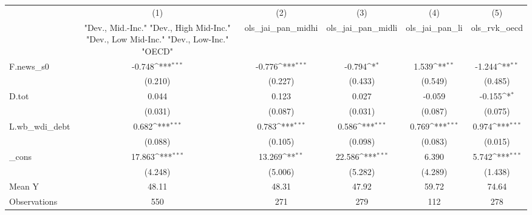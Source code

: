 {
\def\sym#1{\ifmmode^{#1}\else\(^{#1}\)\fi}
\begin{tabular}{l*{5}{c}}
\toprule
            &\multicolumn{1}{c}{(1)}&\multicolumn{1}{c}{(2)}&\multicolumn{1}{c}{(3)}&\multicolumn{1}{c}{(4)}&\multicolumn{1}{c}{(5)}\\
            &\multicolumn{1}{c}{ "Dev., Mid.-Inc." "Dev., High Mid-Inc." "Dev., Low Mid-Inc." "Dev., Low-Inc." "OECD" }&\multicolumn{1}{c}{ols\_jai\_pan\_midhi}&\multicolumn{1}{c}{ols\_jai\_pan\_midli}&\multicolumn{1}{c}{ols\_jai\_pan\_li}&\multicolumn{1}{c}{ols\_rvk\_oecd}\\
\midrule
F.news\_s0   &      -0.748\sym{***}&      -0.776\sym{***}&      -0.794\sym{*}  &       1.539\sym{**} &      -1.244\sym{**} \\
            &     (0.210)         &     (0.227)         &     (0.433)         &     (0.549)         &     (0.485)         \\
\addlinespace
D.tot       &       0.044         &       0.123         &       0.027         &      -0.059         &      -0.155\sym{*}  \\
            &     (0.031)         &     (0.087)         &     (0.031)         &     (0.087)         &     (0.075)         \\
\addlinespace
L.wb\_wdi\_debt&       0.682\sym{***}&       0.783\sym{***}&       0.586\sym{***}&       0.769\sym{***}&       0.974\sym{***}\\
            &     (0.088)         &     (0.105)         &     (0.098)         &     (0.083)         &     (0.015)         \\
\addlinespace
\_cons      &      17.863\sym{***}&      13.269\sym{**} &      22.586\sym{***}&       6.390         &       5.742\sym{***}\\
            &     (4.248)         &     (5.006)         &     (5.282)         &     (4.289)         &     (1.438)         \\
\midrule
Mean Y      &       48.11         &       48.31         &       47.92         &       59.72         &       74.64         \\
Observations&         550         &         271         &         279         &         112         &         278         \\
\bottomrule
\end{tabular}
}
